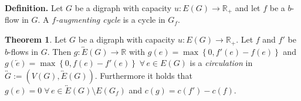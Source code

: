 \documentclass[a4paper]{article}
\theoremstyle{definition}
\newtheorem{theorem}{Theorem}
\newcommand{\set}[1]{\left\{#1\right\}}
\newcommand{\fall}{\;\forall\,}
\begin{document}
\textbf{Definition.}
  Let $G$ be a digraph with capacity $u: E(G) \rightarrow \mathbb{R}_+$ and let $f$ be a $b$-flow in $G$.
  A \emph{$f$-augmenting cycle} is a cycle in $G_f$.

\begin{theorem}\label{proposition-5.1}
  Let $G$ be a digraph with capacity $u: E(G) \rightarrow \mathbb{R}_+$. Let $f$ and $f'$ be $b$-flows in $G$. Then $g: \overleftrightarrow{E}(G) \rightarrow \mathbb{R}$ with $g(e) = \max\set{0,f'(e) - f(e)}$ and $g(\overleftarrow{e}) = \max\set{0, f(e) - f'(e)} \fall e \in E(G)$ is a \emph{circulation} in $\overleftrightarrow{G} := (V(G), \overleftrightarrow{E}(G))$. Furthermore it holds that $g(e) = 0 \fall e \in \overleftrightarrow E(G) \setminus E(G_f)$ and $c(g) = c(f') - c(f)$.
\end{theorem}
\end{document}
